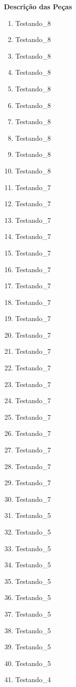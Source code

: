 \documentclass[a4paper,landscape]{article}
\begin{document}
\begin{center} 
\large
\textbf{Descrição das Peças}\\\vspace*{10px} 
 \end{center}\begin{enumerate}\item Testando_8
\item Testando_8
\item Testando_8
\item Testando_8
\item Testando_8
\item Testando_8
\item Testando_8
\item Testando_8
\item Testando_8
\item Testando_8
\item Testando_7
\item Testando_7
\item Testando_7
\item Testando_7
\item Testando_7
\item Testando_7
\item Testando_7
\item Testando_7
\item Testando_7
\item Testando_7
\item Testando_7
\item Testando_7
\item Testando_7
\item Testando_7
\item Testando_7
\item Testando_7
\item Testando_7
\item Testando_7
\item Testando_7
\item Testando_7
\item Testando_5
\item Testando_5
\item Testando_5
\item Testando_5
\item Testando_5
\item Testando_5
\item Testando_5
\item Testando_5
\item Testando_5
\item Testando_5
\item Testando_4

\end{enumerate}
\end{document}
